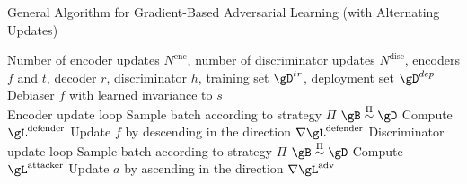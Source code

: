 \algrenewcommand{}
\algrenewcommand{}
\begin{algorithm}
  \caption{General Algorithm for Gradient-Based Adversarial Learning (with Alternating Updates)}\label{alg:cap} 
  \begin{algorithmic}
    \Require Number of encoder updates $N^\text{enc}$, number of discriminator updates $N^\text{disc}$,
    encoders $f$ and $t$, decoder $r$, discriminator $h$, training set $\gD^{tr}$, deployment set
    $\gD^{dep}$
    \Ensure Debiaser $f$ with learned invariance to $s$
    \\

     \Comment Encoder update loop
    \State Sample batch according to strategy \( \Pi \) \( \gB \stackrel{\Pi} \sim \gD \)
    \State Compute $\gL^\text{defender}$
    \State Update $f$ by descending in the direction $\nabla \gL^\text{defender}$
     \Comment Discriminator update loop
    \State Sample batch according to strategy \( \Pi \) \( \gB \stackrel{\Pi} \sim \gD \)
    \State Compute $\gL^\text{attacker}$
    \State Update $a$ by ascending in the direction $\nabla \gL^\text{adv}$
    \EndFor
    \EndFor

  \end{algorithmic}
\end{algorithm}

